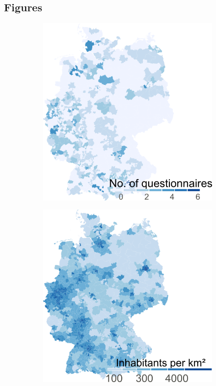 \documentclass{bmcart}
\begin{document}
\begin{backmatter}
\section*{Figures}
\begin{figure}[!h]
\centering
\begin{subfigure}[b]{0.35\linewidth}
\includegraphics[width=.90\textwidth]{fig1a.questionnaires.v1.0.png}
\label{fig1:questionnaires}
\end{subfigure}%
\begin{subfigure}[b]{0.35\linewidth}
\includegraphics[width=.90\textwidth]{fig1b.population_density.1.0.png}

\end{subfigure}
\end{figure}
\end{backmatter}
\end{document}
